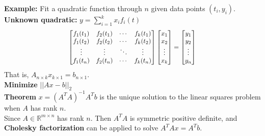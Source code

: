 \documentclass[9pt]{article}
\begin{document}
\begin{multicols}{3}
\vspace{-0.35cm}
\textbf{Example: } Fit a quadratic function through $n$ given data points $(t_i, y_i)$. \textbf{Unknown quadratic: } $y = \sum_{i=1}^{k} x_i f_i(t)$
\[
\scalebox{0.9}{$
\begin{bmatrix}
    f_1(t_1) & f_2(t_1) & \cdots & f_k(t_1)\\
    f_1(t_2) & f_2(t_2) & \cdots & f_k(t_2)\\
    \vdots & \vdots & \ddots & \vdots \\
    f_1(t_n) & f_2(t_n) & \cdots & f_k(t_n)\\
\end{bmatrix}
\begin{bmatrix}
    x_1\\
    x_2\\
    \vdots\\
    x_k
\end{bmatrix}
=
\begin{bmatrix}
    y_1\\
    y_2\\
    \vdots\\
    y_n
\end{bmatrix}
$}
\]
That is, $A_{n \times k}x_{k \times 1} = b_{n \times 1}$.\\
\textbf{Minimize} $|| Ax - b ||_2$\\

\textbf{Theorem}
$x = (A^T A)^{-1} A^T b$ is the unique solution to the linear squares problem when $A$ has rank $n$.\\

Since $A \in \mathbb{R}^{m \times n}$ has rank $n$. Then $A^TA$ is symmetric positive definite, and \textbf{Cholesky factorization} can be applied to solve $A^TAx = A^Tb$.

\hdashrule{\linewidth}{0.5pt}{1mm 1mm}
\vspace{-0.8cm}

\end{multicols}
\end{document}
